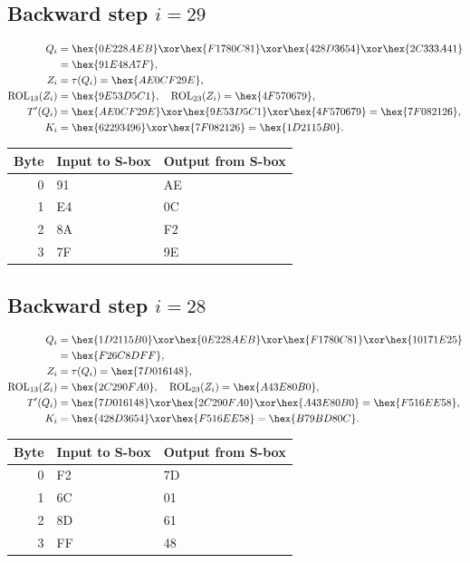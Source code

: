 \subsection*{Backward step $i=29$}
\begin{align*}
Q_i&=\hex{0E228AEB}\xor\hex{F1780C81}\xor\hex{428D3654}\xor\hex{2C333A41}\\&=\hex{91E48A7F},\\
Z_i&=\tau(Q_i)=\hex{AE0CF29E},\\
\operatorname{ROL}_{13}(Z_i)&=\hex{9E53D5C1},\quad\operatorname{ROL}_{23}(Z_i)=\hex{4F570679},\\
T'(Q_i)&=\hex{AE0CF29E}\xor\hex{9E53D5C1}\xor\hex{4F570679}=\hex{7F082126},\\
K_i&=\hex{62293496}\xor\hex{7F082126}=\hex{1D2115B0}.\end{align*}
\begingroup\small
\begin{longtable}{rll}
\toprule
Byte & Input to S-box & Output from S-box\\\midrule
\endhead
0 & 91 & AE\\
1 & E4 & 0C\\
2 & 8A & F2\\
3 & 7F & 9E\\
\bottomrule\end{longtable}
\endgroup
\subsection*{Backward step $i=28$}
\begin{align*}
Q_i&=\hex{1D2115B0}\xor\hex{0E228AEB}\xor\hex{F1780C81}\xor\hex{10171E25}\\&=\hex{F26C8DFF},\\
Z_i&=\tau(Q_i)=\hex{7D016148},\\
\operatorname{ROL}_{13}(Z_i)&=\hex{2C290FA0},\quad\operatorname{ROL}_{23}(Z_i)=\hex{A43E80B0},\\
T'(Q_i)&=\hex{7D016148}\xor\hex{2C290FA0}\xor\hex{A43E80B0}=\hex{F516EE58},\\
K_i&=\hex{428D3654}\xor\hex{F516EE58}=\hex{B79BD80C}.\end{align*}
\begingroup\small
\begin{longtable}{rll}
\toprule
Byte & Input to S-box & Output from S-box\\\midrule
\endhead
0 & F2 & 7D\\
1 & 6C & 01\\
2 & 8D & 61\\
3 & FF & 48\\
\bottomrule\end{longtable}
\endgroup
